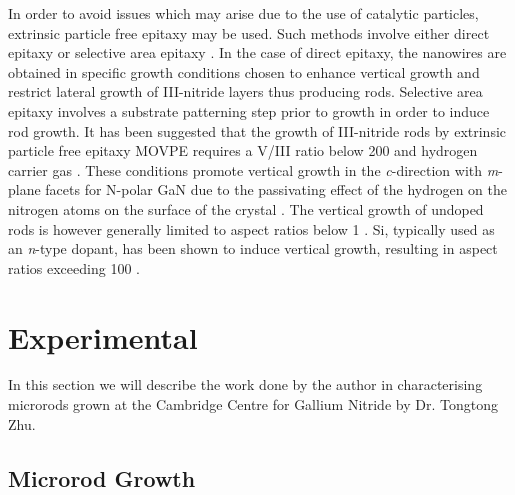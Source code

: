 In order to avoid issues which may arise due to the use of catalytic particles, extrinsic particle free epitaxy may be used. Such methods involve either direct epitaxy \cite{Cheze2010} or selective area epitaxy \cite{Hersee2006}. In the case of direct epitaxy, the nanowires are obtained in specific growth conditions chosen to enhance vertical growth and restrict lateral growth of III-nitride layers thus producing rods. Selective area epitaxy involves a substrate patterning step prior to growth in order to induce rod growth. It has been suggested that the growth of III-nitride rods by extrinsic particle free epitaxy MOVPE requires a V/III ratio below 200 and hydrogen carrier gas \cite{Tessarek2014a}. These conditions promote vertical growth in the \textit{c}-direction with \textit{m}-plane facets for N-polar GaN due to the passivating effect of the hydrogen on the nitrogen atoms on the surface of the crystal \cite{Li2011}. The vertical growth of undoped rods is however generally limited to aspect ratios below 1 \cite{Tessarek2014a}. Si, typically used as an \textit{n}-type dopant, has been shown to induce vertical growth, resulting in aspect ratios exceeding 100 \cite{Tessarek2013,Koester2010}.
 
\section{Experimental}
In this section we will describe the work done by the author in characterising microrods grown at the Cambridge Centre for Gallium Nitride by Dr. Tongtong Zhu.

\subsection{Microrod Growth}

